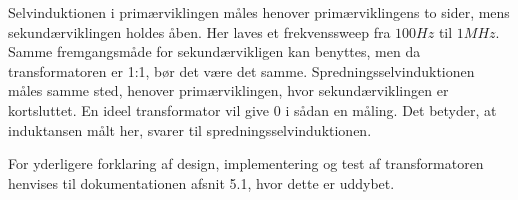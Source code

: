Selvinduktionen i primærviklingen måles henover primærviklingens to sider, mens sekundærviklingen holdes åben. Her laves et frekvenssweep fra $100Hz$ til $1MHz$. Samme fremgangsmåde for sekundærvikligen kan benyttes, men da transformatoren er 1:1, bør det være det samme.
Spredningsselvinduktionen måles samme sted, henover primærviklingen, hvor sekundærviklingen er kortsluttet. En ideel transformator vil give 0 i sådan en måling. Det betyder, at induktansen målt her, svarer til spredningsselvinduktionen. 

For yderligere forklaring af design, implementering og test af transformatoren henvises til dokumentationen afsnit 5.1, hvor dette er uddybet.